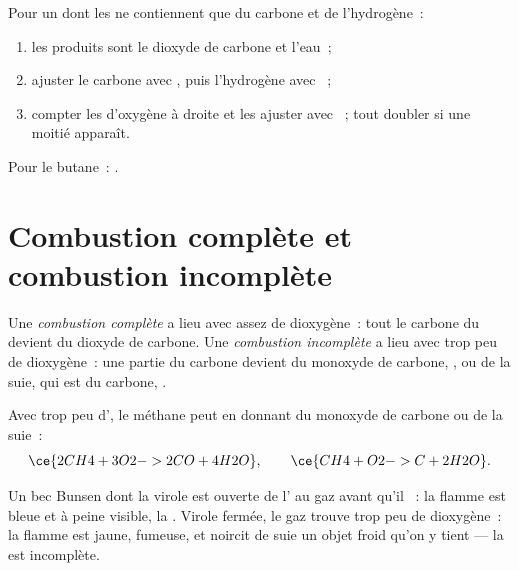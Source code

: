 \begin{method}\label{met:g8:combustion-and-fuels:write}
Pour un  dont les  ne contiennent que du carbone et
de l'hydrogène~:
\begin{enumerate}
  \item les produits sont le dioxyde de carbone et l'eau~;
  \item ajuster le carbone avec , puis l'hydrogène avec
        ~;
  \item compter les  d'oxygène à droite et les ajuster avec
        ~; tout doubler si une moitié apparaît.
\end{enumerate}
Pour le butane~: .
\end{method}

\section{Combustion complète et combustion incomplète}

\begin{definition}\label{def:g8:combustion-and-fuels:complete}
Une \emph{combustion complète} a lieu avec
assez de dioxygène~: tout le carbone du  devient du dioxyde
de carbone. Une \emph{combustion incomplète}
a lieu avec trop peu de dioxygène~: une partie du carbone devient du
monoxyde de carbone, , ou de la suie, qui est du carbone, .
\end{definition}

\begin{example}\label{ex:g8:combustion-and-fuels:incomplete}
Avec trop peu d', le méthane peut  en donnant du monoxyde de
carbone ou de la suie~:
\[
  \ce{2CH4 + 3O2 -> 2CO + 4H2O}, \qquad \ce{CH4 + O2 -> C + 2H2O}.
\]
\end{example}

\begin{proposition}\label{prop:g8:combustion-and-fuels:flame}
Un bec Bunsen dont la virole est ouverte  de l' au gaz avant
qu'il ~: la flamme est bleue et à peine visible, la . Virole fermée, le gaz trouve trop peu de dioxygène~: la flamme
est jaune, fumeuse, et noircit de suie un objet froid qu'on y tient ---
la  est incomplète.
\end{proposition}

